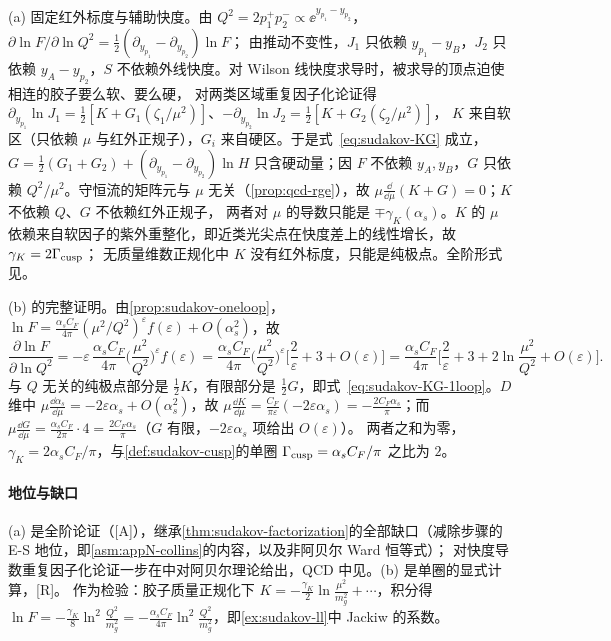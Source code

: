 \begin{proofsketch}
(a) 固定红外标度与辅助快度。由 $Q^2=2p_1^+p_2^-\propto\ee^{y_{p_1}-y_{p_2}}$，$\partial\ln F/\partial\ln Q^2=\frac12(\partial_{y_{p_1}}-\partial_{y_{p_2}})\ln F$；
由推动不变性，$J_1$ 只依赖 $y_{p_1}-y_B$，$J_2$ 只依赖 $y_A-y_{p_2}$，$S$ 不依赖外线快度。对 Wilson 线快度求导时，被求导的顶点迫使相连的胶子要么软、要么硬，
对两类区域重复因子化论证得 $\partial_{y_{p_1}}\ln J_1=\frac12[K+G_1(\zeta_1/\mu^2)]$、$-\partial_{y_{p_2}}\ln J_2=\frac12[K+G_2(\zeta_2/\mu^2)]$，
$K$ 来自软区（只依赖 $\mu$ 与红外正规子），$G_i$ 来自硬区\cite[式~(10.112)--(10.117)]{Collins2011}。于是式~\eqref{eq:sudakov-KG} 成立，$G=\frac12(G_1+G_2)+(\partial_{y_{p_1}}-\partial_{y_{p_2}})\ln H$
只含硬动量；因 $F$ 不依赖 $y_A,y_B$，$G$ 只依赖 $Q^2/\mu^2$。守恒流的矩阵元与 $\mu$ 无关（\cref{prop:qcd-rge}），故 $\mu\frac{\dd}{\dd\mu}(K+G)=0$；$K$ 不依赖 $Q$、$G$ 不依赖红外正规子，
两者对 $\mu$ 的导数只能是 $\mp\gamma_K(\alpha_s)$。$K$ 的 $\mu$ 依赖来自软因子的紫外重整化，即近类光尖点在快度差上的线性增长，故 $\gamma_K=2\Gamma_{\rm cusp}$\cite{Korchemsky1989,KorchemskyRadyushkin1987}；
无质量维数正规化中 $K$ 没有红外标度，只能是纯极点。全阶形式见\cite{Collins:1980ih,Collins:1989bt,Magnea:1990zb}。

(b) 的完整证明。由\cref{prop:sudakov-oneloop}，$\ln F=\frac{\alpha_sC_F}{4\pi}(\mu^2/Q^2)^\varepsilon f(\varepsilon)+O(\alpha_s^2)$，故
\[
\frac{\partial\ln F}{\partial\ln Q^2}=-\varepsilon\,\frac{\alpha_sC_F}{4\pi}\Big(\frac{\mu^2}{Q^2}\Big)^{\varepsilon}f(\varepsilon)
=\frac{\alpha_sC_F}{4\pi}\Big(\frac{\mu^2}{Q^2}\Big)^{\varepsilon}\Big[\frac2\varepsilon+3+O(\varepsilon)\Big]
=\frac{\alpha_sC_F}{4\pi}\Big[\frac2\varepsilon+3+2\ln\frac{\mu^2}{Q^2}+O(\varepsilon)\Big].
\]
与 $Q$ 无关的纯极点部分是 $\frac12K$，有限部分是 $\frac12G$，即式~\eqref{eq:sudakov-KG-1loop}。$D$ 维中 $\mu\frac{\dd\alpha_s}{\dd\mu}=-2\varepsilon\alpha_s+O(\alpha_s^2)$，故
$\mu\frac{\dd K}{\dd\mu}=\frac{C_F}{\pi\varepsilon}(-2\varepsilon\alpha_s)=-\frac{2C_F\alpha_s}\pi$；而 $\mu\frac{\dd G}{\dd\mu}=\frac{\alpha_sC_F}{2\pi}\cdot4=\frac{2C_F\alpha_s}\pi$（$G$ 有限，$-2\varepsilon\alpha_s$ 项给出 $O(\varepsilon)$）。
两者之和为零，$\gamma_K=2\alpha_sC_F/\pi$，与\cref{def:sudakov-cusp}的单圈 $\Gamma_{\rm cusp}=\alpha_sC_F/\pi$ 之比为 $2$。
\end{proofsketch}

\paragraph{地位与缺口}(a) 是全阶论证（[A]），继承\cref{thm:sudakov-factorization}的全部缺口（减除步骤的 E-S 地位，即\cref{asm:appN-collins}的内容，以及非阿贝尔 Ward 恒等式）；
对快度导数重复因子化论证一步在\cite[第~10.10~节]{Collins2011}中对阿贝尔理论给出，QCD 中见\cite{Collins:1989bt,Magnea:1990zb}。(b) 是单圈的显式计算，[R]。
作为检验：胶子质量正规化下 $K=-\frac{\gamma_K}2\ln\frac{\mu^2}{m_g^2}+\cdots$，积分得 $\ln F=-\frac{\gamma_K}8\ln^2\frac{Q^2}{m_g^2}=-\frac{\alpha_sC_F}{4\pi}\ln^2\frac{Q^2}{m_g^2}$，即\cref{ex:sudakov-ll}中 Jackiw 的系数。

